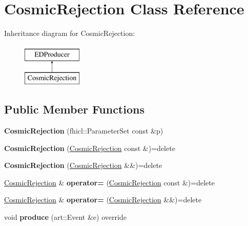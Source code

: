 \hypertarget{classCosmicRejection}{\section{Cosmic\-Rejection Class Reference}
\label{classCosmicRejection}
}
Inheritance diagram for Cosmic\-Rejection\-:\begin{figure}[H]
\begin{center}
\leavevmode
\includegraphics[height=2.000000cm]{classCosmicRejection}
\end{center}
\end{figure}
\subsection*{Public Member Functions}
\begin{DoxyCompactItemize}
\item 
\hypertarget{classCosmicRejection_a7663d784ec40b8a3ba79b76b775118c7}{{\bfseries Cosmic\-Rejection} (fhicl\-::\-Parameter\-Set const \&p)}\label{classCosmicRejection_a7663d784ec40b8a3ba79b76b775118c7}

\item 
\hypertarget{classCosmicRejection_aa06f3640dbccac91b299101b712bbe97}{{\bfseries Cosmic\-Rejection} (\hyperlink{classCosmicRejection}{Cosmic\-Rejection} const \&)=delete}\label{classCosmicRejection_aa06f3640dbccac91b299101b712bbe97}

\item 
\hypertarget{classCosmicRejection_a391a622a1cfb9b03d3298d046e850f63}{{\bfseries Cosmic\-Rejection} (\hyperlink{classCosmicRejection}{Cosmic\-Rejection} \&\&)=delete}\label{classCosmicRejection_a391a622a1cfb9b03d3298d046e850f63}

\item 
\hypertarget{classCosmicRejection_a49fdc618e61833a84f5f548a16dab324}{\hyperlink{classCosmicRejection}{Cosmic\-Rejection} \& {\bfseries operator=} (\hyperlink{classCosmicRejection}{Cosmic\-Rejection} const \&)=delete}\label{classCosmicRejection_a49fdc618e61833a84f5f548a16dab324}

\item 
\hypertarget{classCosmicRejection_a07294b34f21bfa92ece444820e96faac}{\hyperlink{classCosmicRejection}{Cosmic\-Rejection} \& {\bfseries operator=} (\hyperlink{classCosmicRejection}{Cosmic\-Rejection} \&\&)=delete}\label{classCosmicRejection_a07294b34f21bfa92ece444820e96faac}

\item 
\hypertarget{classCosmicRejection_a5275aff5d81db9b43574ea13d1f15d12}{void {\bfseries produce} (art\-::\-Event \&e) override}\label{classCosmicRejection_a5275aff5d81db9b43574ea13d1f15d12}

\end{DoxyCompactItemize}
